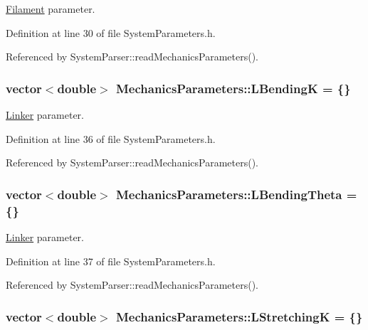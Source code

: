 \hyperlink{classFilament}{Filament} parameter. 



Definition at line 30 of file System\+Parameters.\+h.



Referenced by System\+Parser\+::read\+Mechanics\+Parameters().

\hypertarget{structMechanicsParameters_a4538f8a7ee3c71f1eda540bc41614a55}{
\subsubsection[{L\+Bending\+K}]{\setlength{\rightskip}{0pt plus 5cm}vector$<$double$>$ Mechanics\+Parameters\+::\+L\+Bending\+K = \{\}}}\label{structMechanicsParameters_a4538f8a7ee3c71f1eda540bc41614a55}


\hyperlink{classLinker}{Linker} parameter. 



Definition at line 36 of file System\+Parameters.\+h.



Referenced by System\+Parser\+::read\+Mechanics\+Parameters().

\hypertarget{structMechanicsParameters_aab9d6facd9ba3939017117cd5bff60db}{
\subsubsection[{L\+Bending\+Theta}]{\setlength{\rightskip}{0pt plus 5cm}vector$<$double$>$ Mechanics\+Parameters\+::\+L\+Bending\+Theta = \{\}}}\label{structMechanicsParameters_aab9d6facd9ba3939017117cd5bff60db}


\hyperlink{classLinker}{Linker} parameter. 



Definition at line 37 of file System\+Parameters.\+h.



Referenced by System\+Parser\+::read\+Mechanics\+Parameters().

\hypertarget{structMechanicsParameters_aea1e85562167210db74aa3ffd0013bd7}{
\subsubsection[{L\+Stretching\+K}]{\setlength{\rightskip}{0pt plus 5cm}vector$<$double$>$ Mechanics\+Parameters\+::\+L\+Stretching\+K = \{\}}}\label{structMechanicsParameters_aea1e85562167210db74aa3ffd0013bd7}


